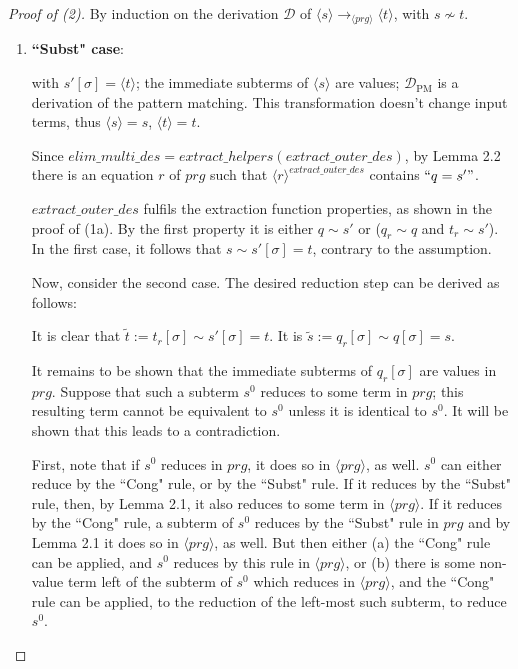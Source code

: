 \documentclass[11pt]{article} %
\begin{document}
\begin{proof}[Proof of (2)] By induction on the derivation $\mathcal{D}$ of $\langle s \rangle \longrightarrow_{\langle prg \rangle} \langle t \rangle$, with $s \not\sim t$.

\begin{enumerate}
\item \textbf{``Subst" case}:

\begin{prooftree}
\end{prooftree}

with $s'[\sigma] = \langle t \rangle$; the immediate subterms of $\langle s \rangle$ are values; $\mathcal{D}_{\textrm{PM}}$ is a derivation of the pattern matching. This transformation doesn't change input terms, thus $\langle s \rangle = s$, $\langle t \rangle = t$.

Since $elim\_multi\_des = extract\_helpers(extract\_outer\_des)$, by Lemma 2.2 there is an equation $r$ of $prg$ such that $\langle r \rangle^{extract\_outer\_des}$ contains $`` q = s' "$.

$extract\_outer\_des$ fulfils the extraction function properties, as shown in the proof of (1a). By the first property it is either $q \sim s'$ or ($q_r \sim q$ and $t_r \sim s'$). In the first case, it follows that $s \sim s'[\sigma] = t$, contrary to the assumption.

Now, consider the second case. The desired reduction step can be derived as follows:
\begin{prooftree}
\end{prooftree}
It is clear that $\widetilde{t} := t_r[\sigma] \sim s'[\sigma] = t$. It is $\widetilde{s} := q_r[\sigma] \sim q[\sigma] = s$.

It remains to be shown that the immediate subterms of $q_r[\sigma]$ are values in $prg$. Suppose that such a subterm $s^0$ reduces to some term in $prg$; this resulting term cannot be equivalent to $s^0$ unless it is identical to $s^0$. It will be shown that this leads to a contradiction.

First, note that if $s^0$ reduces in $prg$, it does so in $\langle prg \rangle$, as well.
$s^0$ can either reduce by the ``Cong" rule, or by the ``Subst" rule. If it reduces by the ``Subst" rule, then, by Lemma 2.1, it also reduces to some term in $\langle prg \rangle$. If it reduces by the ``Cong" rule, a subterm of $s^0$ reduces by the ``Subst" rule in $prg$ and by Lemma 2.1 it does so in $\langle prg \rangle$, as well. But then either (a) the ``Cong" rule can be applied, and $s^0$ reduces by this rule in $\langle prg \rangle$, or (b) there is some non-value term left of the subterm of $s^0$ which reduces in $\langle prg \rangle$, and the ``Cong" rule can be applied, to the reduction of the left-most such subterm, to reduce $s^0$.


\end{enumerate}
\end{proof}
\end{document}
